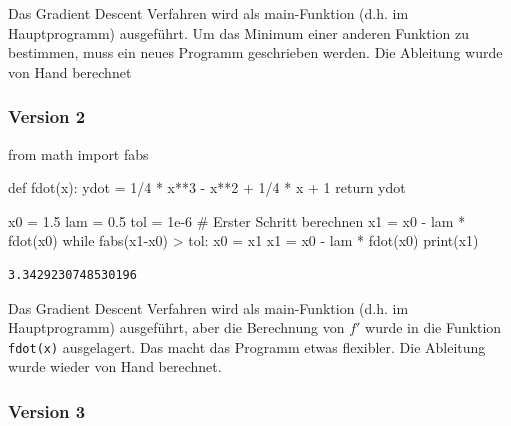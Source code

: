 \documentclass[
  letterpaper,
  DIV=11,
  oneside]{scrreprt}
\newenvironment{Shaded}{\begin{snugshade}}{\end{snugshade}}
\newcommand{\BuiltInTok}[1]{\textcolor[rgb]{0.00,0.23,0.31}{#1}}
\newcommand{\CommentTok}[1]{\textcolor[rgb]{0.37,0.37,0.37}{#1}}
\newcommand{\ControlFlowTok}[1]{\textcolor[rgb]{0.00,0.23,0.31}{#1}}
\newcommand{\DecValTok}[1]{\textcolor[rgb]{0.68,0.00,0.00}{#1}}
\newcommand{\FloatTok}[1]{\textcolor[rgb]{0.68,0.00,0.00}{#1}}
\newcommand{\ImportTok}[1]{\textcolor[rgb]{0.00,0.46,0.62}{#1}}
\newcommand{\KeywordTok}[1]{\textcolor[rgb]{0.00,0.23,0.31}{#1}}
\newcommand{\NormalTok}[1]{\textcolor[rgb]{0.00,0.23,0.31}{#1}}
\newcommand{\OperatorTok}[1]{\textcolor[rgb]{0.37,0.37,0.37}{#1}}
\theoremstyle{definition}
\theoremstyle{definition}
\theoremstyle{remark}
\begin{document}
\begin{tcolorbox}
Das Gradient Descent Verfahren wird als main-Funktion (d.h. im
Hauptprogramm) ausgeführt. Um das Minimum einer anderen Funktion zu
bestimmen, muss ein neues Programm geschrieben werden. Die Ableitung
wurde von Hand berechnet

\hypertarget{version-2-1}{%
\subsubsection{Version 2}\label{version-2-1}}

\begin{Shaded}
\begin{Highlighting}[]
\ImportTok{from}\NormalTok{ math }\ImportTok{import}\NormalTok{ fabs}

\KeywordTok{def}\NormalTok{ fdot(x):}
\NormalTok{    ydot }\OperatorTok{=} \DecValTok{1}\OperatorTok{/}\DecValTok{4} \OperatorTok{*}\NormalTok{ x}\OperatorTok{**}\DecValTok{3} \OperatorTok{{-}}\NormalTok{ x}\OperatorTok{**}\DecValTok{2} \OperatorTok{+} \DecValTok{1}\OperatorTok{/}\DecValTok{4} \OperatorTok{*}\NormalTok{ x }\OperatorTok{+} \DecValTok{1}
    \ControlFlowTok{return}\NormalTok{ ydot}

\NormalTok{x0 }\OperatorTok{=} \FloatTok{1.5}
\NormalTok{lam }\OperatorTok{=} \FloatTok{0.5}
\NormalTok{tol }\OperatorTok{=} \FloatTok{1e{-}6}
\CommentTok{\# Erster Schritt berechnen}
\NormalTok{x1 }\OperatorTok{=}\NormalTok{ x0 }\OperatorTok{{-}}\NormalTok{ lam }\OperatorTok{*}\NormalTok{ fdot(x0)}
\ControlFlowTok{while}\NormalTok{ fabs(x1}\OperatorTok{{-}}\NormalTok{x0) }\OperatorTok{\textgreater{}}\NormalTok{ tol:}
\NormalTok{    x0 }\OperatorTok{=}\NormalTok{ x1}
\NormalTok{    x1 }\OperatorTok{=}\NormalTok{ x0 }\OperatorTok{{-}}\NormalTok{ lam }\OperatorTok{*}\NormalTok{ fdot(x0)}
\BuiltInTok{print}\NormalTok{(x1)}
\end{Highlighting}
\end{Shaded}

\begin{verbatim}
3.3429230748530196
\end{verbatim}

Das Gradient Descent Verfahren wird als main-Funktion (d.h. im
Hauptprogramm) ausgeführt, aber die Berechnung von \(f'\) wurde in die
Funktion \texttt{fdot(x)} ausgelagert. Das macht das Programm etwas
flexibler. Die Ableitung wurde wieder von Hand berechnet.

\hypertarget{version-3-1}{%
\subsubsection{Version 3}\label{version-3-1}}


\end{tcolorbox}
\end{document}
